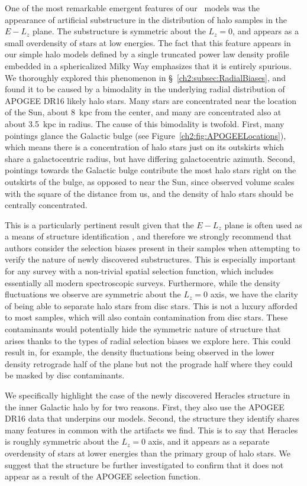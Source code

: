 One of the most remarkable emergent features of our \survey\ models was the appearance of artificial substructure in the distribution of halo samples in the $E-L_{z}$ plane. The substructure is symmetric about the $L_{z}=0$, and appears as a small overdensity of stars at low energies. The fact that this feature appears in our simple halo models defined by a single truncated power law density profile embedded in a sphericalized Milky Way emphasizes that it is entirely spurious. We thoroughly explored this phenomenon in \S~\ref{ch2:subsec:RadialBiases}, and found it to be caused by a bimodality in the underlying radial distribution of APOGEE DR16 likely halo stars. Many stars are concentrated near the location of the Sun, about 8~kpc from the center, and many are concentrated also at about 3.5~kpc in radius. The cause of this bimodality is twofold. First, many pointings glance the Galactic bulge (see Figure~\ref{ch2:fig:APOGEELocations}), which means there is a concentration of halo stars just on its outskirts which share a galactocentric radius, but have differing galactocentric azimuth. Second, pointings towards the Galactic bulge contribute the most halo stars right on the outskirts of the bulge, as opposed to near the Sun, since observed volume scales with the square of the distance from us, and the density of halo stars should be centrally concentrated.

This is a particularly pertinent result given that the $E-L_{z}$ plane is often used as a means of structure identification \parencite[e.g.][]{helmi18,koppelman19b,horta21a}, and therefore we strongly recommend that authors consider the selection biases present in their samples when attempting to verify the nature of newly discovered substructures. This is especially important for any survey with a non-trivial spatial selection function, which includes essentially all modern spectroscopic surveys. Furthermore, while the density fluctuations we observe are symmetric about the $L_{z}=0$ axis, we have the clarity of being able to separate halo stars from disc stars. This is not a luxury afforded to most samples, which will also contain contamination from disc stars. These contaminants would potentially hide the symmetric nature of structure that arises thanks to the types of radial selection biases we explore here. This could result in, for example, the density fluctuations being observed in the lower density retrograde half of the plane but not the prograde half where they could be masked by disc contaminants.

We specifically highlight the case of the newly discovered Heracles structure in the inner Galactic halo by \textcite{horta21a} for two reasons. First, they also use the APOGEE DR16 data that underpins our models. Second, the structure they identify shares many features in common with the artifacts we find. This is to say that Heracles is roughly symmetric about the $L_{z}=0$ axis, and it appears as a separate overdensity of stars at lower energies than the primary group of halo stars. We suggest that the structure be further investigated to confirm that it does not appear as a result of the APOGEE selection function.

